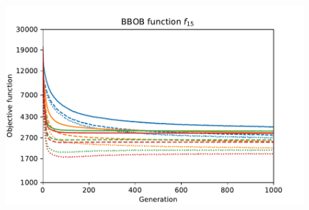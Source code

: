 \begin{figure}[ht!]
\begin{minipage}[t]{0.32\textwidth}
    \end{minipage}
    \hfill
    \begin{minipage}[t]{0.32\textwidth}
        \centering
        \includegraphics[width=\textwidth]{img/runs/fitness_pso2011_f15.pdf}
    \end{minipage}


\end{figure}
